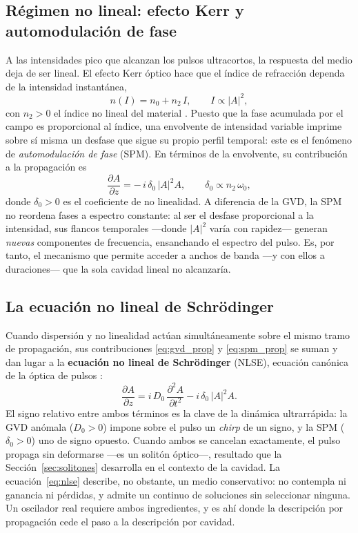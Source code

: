 \subsection{Régimen no lineal: efecto Kerr y automodulación de fase}

A las intensidades pico que alcanzan los pulsos ultracortos, la respuesta del
medio deja de ser lineal. El efecto Kerr óptico hace que el índice de refracción
dependa de la intensidad instantánea,
%
\begin{equation}
    n(I) = n_0 + n_2\,I,
    \qquad I \propto |A|^2,
    \label{eq:kerr}
\end{equation}
%
con $n_2>0$ el índice no lineal del material \cite{Boyd2004}. Puesto que la fase
acumulada por el campo es proporcional al índice, una envolvente de intensidad
variable imprime sobre sí misma un desfase que sigue su propio perfil temporal:
este es el fenómeno de \emph{automodulación de fase} (SPM). En términos de la
envolvente, su contribución a la propagación es
%
\begin{equation}
    \frac{\partial A}{\partial z}
    = -\,i\,\delta_0\,|A|^2 A,
    \qquad \delta_0 \propto n_2\,\omega_0 ,
    \label{eq:spm_prop}
\end{equation}
%
donde $\delta_0>0$ es el coeficiente de no linealidad. A diferencia de la GVD, la
SPM no reordena fases a espectro constante: al ser el desfase proporcional a la
intensidad, sus flancos temporales —donde $|A|^2$ varía con rapidez— generan
\emph{nuevas} componentes de frecuencia, ensanchando el espectro del pulso. Es,
por tanto, el mecanismo que permite acceder a anchos de banda —y con ellos a
duraciones— que la sola cavidad lineal no alcanzaría.

\subsection{La ecuación no lineal de Schrödinger}

Cuando dispersión y no linealidad actúan simultáneamente sobre el mismo tramo de
propagación, sus contribuciones \eqref{eq:gvd_prop} y \eqref{eq:spm_prop} se suman
y dan lugar a la \textbf{ecuación no lineal de Schrödinger} (NLSE), ecuación
canónica de la óptica de pulsos \cite{Agrawal2019}:
%
\begin{equation}
    \frac{\partial A}{\partial z}
    = i\,D_0\,\frac{\partial^2 A}{\partial t^2}
      - i\,\delta_0\,|A|^2 A .
    \label{eq:nlse}
\end{equation}
%
El signo relativo entre ambos términos es la clave de la dinámica ultrarrápida:
la GVD anómala ($D_0>0$) impone sobre el pulso un \emph{chirp} de un signo, y la
SPM ($\delta_0>0$) uno de signo opuesto. Cuando ambos se cancelan exactamente, el
pulso propaga sin deformarse —es un solitón óptico—, resultado que la
Sección~\ref{sec:solitones} desarrolla en el contexto de la cavidad. La
ecuación~\eqref{eq:nlse} describe, no obstante, un medio conservativo: no contempla
ni ganancia ni pérdidas, y admite un continuo de soluciones sin seleccionar
ninguna. Un oscilador real requiere ambos ingredientes, y es ahí donde la
descripción por propagación cede el paso a la descripción por cavidad.

